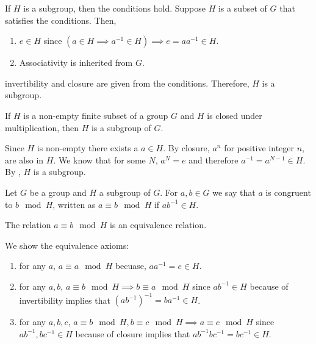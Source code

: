 \begin{prooflemma}
  If \(H\) is a subgroup, then the conditions hold. Suppose \(H\) is a subset of \(G\) that satisfies the conditions. Then, 
  \begin{enumerate}
      \item \(e \in H\) since \((a \in H \implies a^{-1} \in H) \implies e = a a^{-1} \in H\).
      \item Associativity is inherited from \(G\).
  \end{enumerate}
  invertibility and closure are given from the conditions. Therefore, \(H\) is a subgroup.
\end{prooflemma}

\begin{lemma}
    If \(H\) is a non-empty finite subset of a group \(G\) and \(H\) is closed under multiplication, then \(H\) is a subgroup of \(G\).
\end{lemma}

\begin{prooflemma}
    Since \(H\) is non-empty there exists a \(a \in H\). By closure, \(a^n\) for positive integer \(n\), are also in \(H\). We know that for some \(N\), \(a^N = e\) and therefore \(a^{-1} = a^{N - 1} \in H\). By \href{lm:subgroupConditions}, \(H\) is a subgroup.
\end{prooflemma}

\begin{definition}
    Let \(G\) be a group and \(H\) a subgroup of \(G\). For \(a,b \in G\) we say that \(a\) is congruent to \(b \mod{H}\), written as \(a \equiv b \mod{H}\) if \(ab^{-1} \in H\).
\end{definition}

\begin{lemma}
    The relation \(a \equiv b \mod{H}\) is an equivalence relation.
\end{lemma}

\begin{prooflemma}
    We show the equivalence axioms:
    \begin{enumerate}
        \item for any \(a\), \(a \equiv a \mod H\) becuase, \(aa^{-1} = e \in H\).
        \item for any \(a,b\), \(a \equiv b \mod H \implies b \equiv a \mod H\) since \(ab^{-1} \in H \) because of invertibility implies that \( (ab^{-1})^{-1} = ba^{-1} \in H\).
        \item for any \(a,b,c\), \(a \equiv b \mod H, b \equiv c \mod H \implies a \equiv c \mod H\) since \(ab^{-1}, bc^{-1} \in H \) because of closure implies that \( ab^{-1} bc^{-1} = bc^{-1} \in H\).
    \end{enumerate}
\end{prooflemma}

